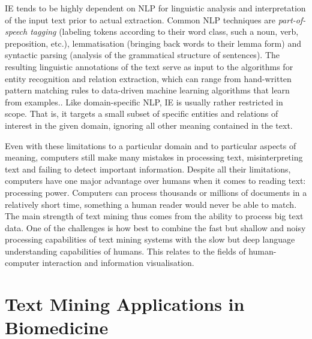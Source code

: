 IE tends to be highly dependent on NLP for linguistic analysis and interpretation of the input text prior to actual extraction.
Common NLP techniques are \emph{part-of-speech tagging} (labeling tokens according to their word class, such a noun, verb, preposition, etc.), lemmatisation (bringing back words to their lemma form) and syntactic parsing (analysis of the grammatical structure of sentences).
The resulting linguistic annotations of the text serve as input to the algorithms for entity recognition and relation extraction, which can range from hand-written pattern matching rules to data-driven machine learning algorithms that learn from examples..
Like domain-specific NLP, IE is usually rather restricted in scope.
That is, it targets a small subset of specific entities and relations of interest in the given domain, ignoring all other meaning contained in the text.    

Even with these limitations to a particular domain and to particular aspects of meaning, computers still make many mistakes in processing text, misinterpreting text and failing to detect important information.
Despite all their limitations, computers have one major advantage over humans when it comes to reading text: processing power.
Computers can process thousands or millions of documents in a relatively short time, something a human reader would never be able to match.
The main strength of text mining thus comes from the ability to process big text data.
One of the challenges is how best to combine the fast but shallow and noisy processing capabilities of text mining systems with the slow but deep language understanding capabilities of humans.
This relates to the fields of human-computer interaction and information visualisation.   

\section{Text Mining Applications in Biomedicine}
\label{sec:tm-biomed}

